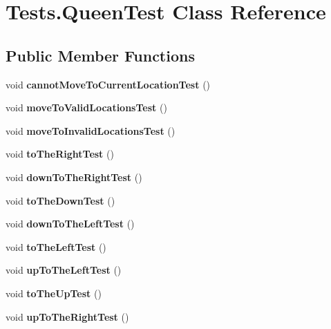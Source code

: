 \hypertarget{class_tests_1_1_queen_test}{}\section{Tests.\+Queen\+Test Class Reference}
\label{class_tests_1_1_queen_test}
\subsection*{Public Member Functions}
\begin{DoxyCompactItemize}
\item 
\mbox{\label{class_tests_1_1_queen_test_ab4578e6eef0448cf97f5d5393a4b4b3d}} 
void {\bfseries cannot\+Move\+To\+Current\+Location\+Test} ()
\item 
\mbox{\label{class_tests_1_1_queen_test_a4e9fa50b947a1d8824bee82a44bedd9e}} 
void {\bfseries move\+To\+Valid\+Locations\+Test} ()
\item 
\mbox{\label{class_tests_1_1_queen_test_a6aeb6a4126f143f8340fd9dc1b64d0c3}} 
void {\bfseries move\+To\+Invalid\+Locations\+Test} ()
\item 
\mbox{\label{class_tests_1_1_queen_test_a3ac906826670f0abee559f48162a3164}} 
void {\bfseries to\+The\+Right\+Test} ()
\item 
\mbox{\label{class_tests_1_1_queen_test_a5ebf90dde5d4f17521ec5f923ad6119d}} 
void {\bfseries down\+To\+The\+Right\+Test} ()
\item 
\mbox{\label{class_tests_1_1_queen_test_a820bcdf667b222caee509a8b0d2b01b6}} 
void {\bfseries to\+The\+Down\+Test} ()
\item 
\mbox{\label{class_tests_1_1_queen_test_a828ce902c3341ed953761d3f11d56578}} 
void {\bfseries down\+To\+The\+Left\+Test} ()
\item 
\mbox{\label{class_tests_1_1_queen_test_a72bfcb51507a6adfb8b6891a7753d403}} 
void {\bfseries to\+The\+Left\+Test} ()
\item 
\mbox{\label{class_tests_1_1_queen_test_a5bfeba3640366b33c6d34801fed8ec9f}} 
void {\bfseries up\+To\+The\+Left\+Test} ()
\item 
\mbox{\label{class_tests_1_1_queen_test_a9ac920a1318f20da88eb2c11b14a9a2b}} 
void {\bfseries to\+The\+Up\+Test} ()
\item 
\mbox{\label{class_tests_1_1_queen_test_a6c4df47daf3beac90694d2cbe7b1635e}} 
void {\bfseries up\+To\+The\+Right\+Test} ()
\end{DoxyCompactItemize}


